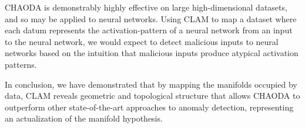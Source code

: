 
CHAODA is demonstrably highly effective on large high-dimensional datasets, and so may be applied to neural networks.
Using CLAM to map a dataset where each datum represents the activation-pattern of a neural network from an input to the neural network, we would expect to detect malicious inputs to neural networks based on the intuition that malicious inputs produce atypical activation patterns.

In conclusion, we have demonstrated that by mapping the manifolds occupied by data, CLAM reveals geometric and topological structure that allows CHAODA to outperform other state-of-the-art approaches to anomaly detection, representing an actualization of the manifold hypothesis.
